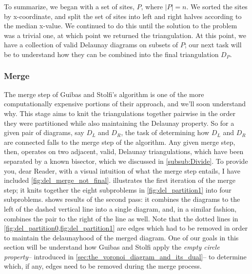 \documentclass[12pt,twoside]{reedthesis}
\begin{document}
    To summarize, we began with a set of sites, $P$, where $\mid P\mid = n$. We sorted the sites by x-coordinate, and split the set of sites into left and right halves according to the median x-value. We continued to do this until the solution to the problem was a trivial one, at which point we returned the triangulation. At this point, we have a collection of valid Delaunay diagrams on subsets of $P$; our next task will be to understand how they can be combined into the final triangulation $D_{P}$.

  \subsubsection{Merge}
  \label{subsub:Merge}
    The merge step of Guibas and Stolfi's algorithm is one of the more computationally expensive portions of their approach, and we'll soon understand why. This stage aims to knit the triangulations together pairwise in the order they were partitioned while also maintaining the Delaunay property. So for a given pair of diagrams, say $D_{L}$ and $D_{R}$, the task of determining how $D_{L}$ and $D_{R}$ are connected falls to the merge step of the algorithm. Any given merge step, then, operates on two adjacent, valid, Delaunay triangulations, which have been separated by a known bisector, which we discussed in \cref{subsub:Divide}. To provide you, dear Reader, with a visual intuition of what the merge step entails, I have included \cref{fig:del_merge_not_final}.  illustrates the first iteration of the merge step; it knits together the eight subproblems in \cref{fig:del_partition1} into four subproblems.  shows results of the second pass: it combines the diagrams to the left of the dashed vertical line into a single diagram, and, in a similar fashion, combines the pair to the right of the line as well. Note that the dotted lines in \cref{fig:del_partition0,fig:del_partition1} are edges which had to be removed in order to maintain the delaunayhood of the merged diagram.  One of our goals in this section will be understand how Guibas and Stolfi apply the \emph{empty circle property}-- introduced in \cref{sec:the_voronoi_diagram_and_its_dual}-- to determine which, if any, edges need to be removed during the merge process.\par
\end{document}
